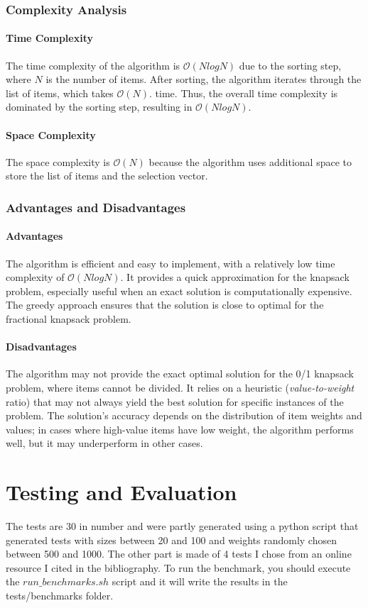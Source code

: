 \documentclass[runningheads]{llncs}
\begin{document}
\subsubsection{Complexity Analysis}
\paragraph{Time Complexity}
The time complexity of the algorithm is $\mathcal{O}(NlogN)$ due to the sorting step, where $N$ is
the number of items. After sorting, the algorithm iterates through the list of items, which takes $\mathcal{O}(N)$.
time. Thus, the overall time complexity is dominated by the sorting step, resulting in 
$\mathcal{O}(NlogN)$.

\paragraph{Space Complexity}
The space complexity is $\mathcal{O}(N)$ because the algorithm uses additional space to store the
list of items and the selection vector.

\subsubsection{Advantages and Disadvantages}
\paragraph{Advantages}
The algorithm is efficient and easy to implement, with a relatively low time complexity of 
$\mathcal{O}(NlogN)$. It provides a quick approximation for the knapsack problem, especially useful
when an exact solution is computationally expensive. The greedy approach ensures that the solution
is close to optimal for the fractional knapsack problem.

\paragraph{Disadvantages}
The algorithm may not provide the exact optimal solution for the 0/1 knapsack problem, where items
cannot be divided. It relies on a heuristic (\textit{value-to-weight} ratio) that may not always
yield the best solution for specific instances of the problem. The solution's accuracy depends on 
the distribution of item weights and values; in cases where high-value items have low weight, the 
algorithm performs well, but it may underperform in other cases.

\section{Testing and Evaluation}
The tests are 30 in number and were partly generated using a python script that generated tests with
sizes between 20 and 100 and weights randomly chosen between 500 and 1000. The other part is made of
4 tests I chose from an online resource I cited in the bibliography. To run the benchmark, you should
execute the $run\_benchmarks.sh$ script and it will write the results in the 
tests/benchmarks folder.
\end{document}
